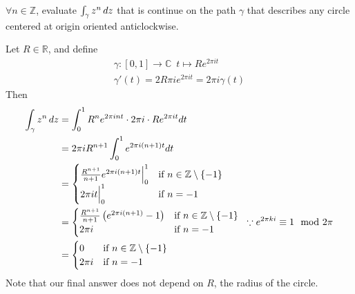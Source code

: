 \documentclass[notoc,notitlepage]{tufte-book}
\begin{document}
\begin{eg}\label{eg:integral_of_path_on_a_circle}
	$\forall n \in \mathbb{Z}$, evaluate $\int_{\gamma} z^n \mathop{}\!d{z}$ that is continue on the path $\gamma$ that describes any circle centered at origin oriented anticlockwise.

	\begin{solution}
		Let $R \in \mathbb{R}$, and define
		\begin{gather*}
			\gamma: [0, 1] \to \mathbb{C} \enspace t \mapsto Re^{2\pi i t} \\
			\gamma'(t) = 2R\pi i e^{2\pi i t} = 2 \pi i \gamma(t)
		\end{gather*}
		Then
		\begin{align*}
			\int_{\gamma} z^n \mathop{}\!d{z}
				&= \int_{0}^{1} R^ne^{2 \pi i n t} \cdot 2 \pi i \cdot Re^{2 \pi i t} dt \\
				&= 2 \pi i R^{n + 1} \int_{0}^{1} e^{2 \pi i (n + 1) t} dt \\
				&= \begin{cases}
					\frac{R^{n + 1}}{n + 1} e^{2 \pi i (n + 1) t} \Big|_{0}^{1} & \text{if } n \in \mathbb{Z} \setminus \{-1\} \\
					2 \pi i t \Big|_{0}^{1} & \text{if } n = -1
				\end{cases} \\
				&= \begin{cases}
					\frac{R^{n + 1}}{n + 1} \left(e^{2 \pi i (n + 1)} - 1 \right) & \text{if } n \in \mathbb{Z} \setminus \{-1\} \\
					2 \pi i 	& \text{if } n = -1
				\end{cases} \enspace \because e^{2 \pi k i} \equiv 1 \mod 2 \pi\\
				&= \begin{cases}
					0	& \text{if } n \in \mathbb{Z} \setminus \{-1\} \\
					2 \pi i & \text{if } n = -1
				\end{cases}
		\end{align*}
		Note that our final answer does not depend on $R$, the radius of the circle.
	\end{solution}
\end{eg}
\end{document}
